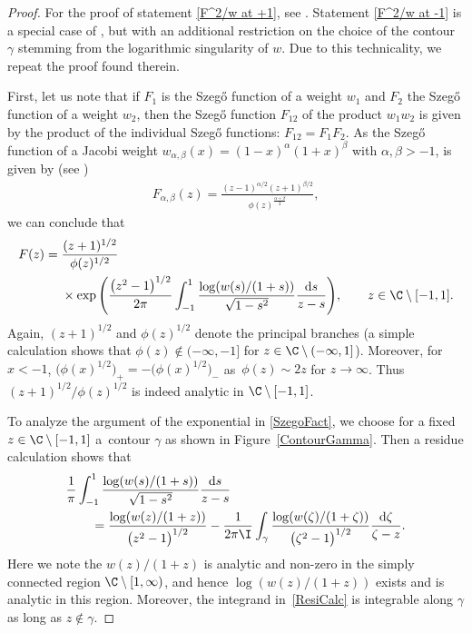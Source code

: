 \begin{proof}
For the proof of statement \eqref{F^2/w at +1}, see \cite[Proposition~A.1]{CD}. Statement \eqref{F^2/w at -1} is a special case of \cite[Lemma~6.6]{KMVV}, but with an additional restriction on the choice of the contour $\gamma$ stemming from the logarithmic singularity of $w$. Due to this technicality, we repeat the proof found therein.

First, let us note that if $F_1$ is the Szeg\H{o} function of a weight $w_1$ and $F_2$ the Szeg\H{o} function of a weight $w_2$, then the Szeg\H{o} function $F_{12}$ of the product $w_1w_2$ is given by the product of the individual Szeg\H{o} functions: $F_{12} = F_1 F_2$. As the Szeg\H{o} function of a Jacobi weight $w_{\alpha,\beta}(x) = (1-x)^\alpha (1+x)^\beta$ with $\alpha, \beta > -1$, is given by (see \cite[Remark 5.1]{KMVV})
\begin{align*}
 F_{\alpha,\beta}(z) = \frac{(z-1)^{\alpha/2}(z+1)^{\beta/2}}{\phi(z)^{\frac{\alpha+\beta}{2}}},
\end{align*}
we can conclude that
\begin{align}
 F(z) ={}& \frac{(z+1)^{1/2}}{\phi(z)^{1/2}}\nonumber\\
 &\times\exp \Bigg( \dfrac{\big(z^2-1\big)^{1/2}}{2 \pi}\int_{-1}^1 \dfrac{\log (w(s)/(1+s))}{\sqrt{1-s^2}} \dfrac{{\rm d}s}{z-s} \Bigg),
 \qquad z \in \C \setminus [-1,1].\label{SzegoFact}
\end{align}
Again, $(z+1)^{1/2}$ and $\phi(z)^{1/2}$ denote the principal branches (a simple calculation shows that $\phi(z) \not \in (-\infty, -1]$ for $z \in \C \setminus (-\infty, 1]$). Moreover, for $x < -1$, $\big(\phi(x)^{1/2}\big)_+ = -\big(\phi(x)^{1/2}\big)_-$ as~$\phi(z) \sim 2z$ for $z \to \infty$. Thus $(z+1)^{1/2}/\phi(z)^{1/2}$ is indeed analytic in $\C\setminus [-1,1]$.

To analyze the argument of the exponential in \eqref{SzegoFact}, we choose for a fixed $z \in \C \setminus [-1,1]$ a~contour $\gamma$ as shown in Figure~\ref{ContourGamma}. Then a residue calculation shows that
\begin{align}\nonumber
 &\frac{1}{\pi} \int_{-1}^1 \frac{\log(w(s)/(1+s))}{\sqrt{1-s^2}} \frac{{\rm d}s}{z-s}
 \\\label{ResiCalc}
 &\qquad= \frac{\log(w(z)/(1+z))}{\big(z^2-1\big)^{1/2}} - \frac{1}{2\pi\I} \int_\gamma\frac{\log(w(\zeta)/(1+\zeta))}{\big(\zeta^2-1\big)^{1/2}} \frac{{\rm d}\zeta}{\zeta-z}.
\end{align}
Here we note the $w(z)/(1+z)$ is analytic and non-zero in the simply connected region $\C \setminus [1,\infty)$, and hence $\log(w(z)/(1+z))$ exists and is analytic in this region. Moreover, the integrand in~\eqref{ResiCalc} is integrable along $\gamma$ as long as $z \not \in \gamma$.


\end{proof}
